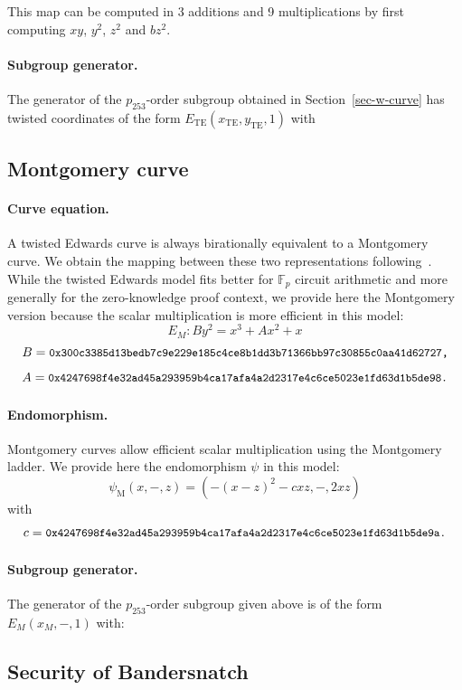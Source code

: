 \documentclass[smallextended]{svjour3}
\begin{document}
This map can be computed in 3 additions and 9 multiplications by
first computing $xy$, $y^2$, $z^2$ and $bz^2$.

\paragraph{Subgroup generator.}
The generator of the $p_{253}$-order subgroup obtained in
Section~\ref{sec-w-curve} has twisted coordinates
of the form $E_\text{TE}(x_\text{TE},y_\text{TE},1)$ with


\subsection{Montgomery curve}
\paragraph{Curve equation.}
A twisted Edwards curve is always birationally equivalent to a
Montgomery curve. We obtain the mapping between these two
representations following~\cite{JCEng:CosSmi18}.
While the twisted Edwards model fits better for $\mathbb F_p$ circuit
arithmetic and more generally for the zero-knowledge proof context, we
provide here the Montgomery version because the scalar multiplication
is more efficient in this model:
$$E_M: By^2 = x^3 + Ax^2 + x$$
$$B = \text{{\small {\tt 0x300c3385d13bedb7c9e229e185c4ce8b1dd3b71366bb97c30855c0aa41d62727,}}}$$
$$A = \text{{\small {\tt 0x4247698f4e32ad45a293959b4ca17afa4a2d2317e4c6ce5023e1fd63d1b5de98.}}}$$

\paragraph{Endomorphism.}
Montgomery curves allow efficient scalar multiplication using the
Montgomery ladder. We provide here the endomorphism $\psi$ in this
model:
$$\psi_\text{M}(x,-,z) = (-(x-z)^2 - cxz, -, 2xz)$$
with
$$c = \text{{\small {\tt 0x4247698f4e32ad45a293959b4ca17afa4a2d2317e4c6ce5023e1fd63d1b5de9a.}}}$$

\paragraph{Subgroup generator.}
The generator of the $p_{253}$-order subgroup given above is of the
form $E_M(x_M,-,1)$ with:


\subsection{Security of Bandersnatch}
\end{document}

